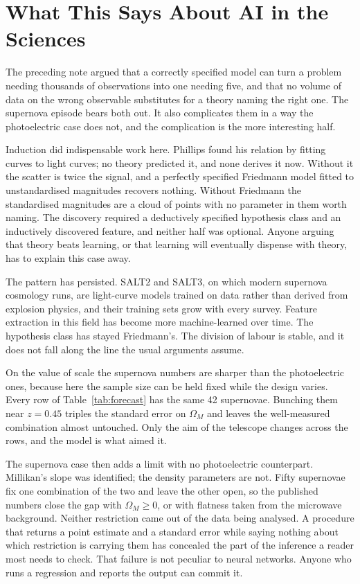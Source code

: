 \documentclass[11pt]{article}
\begin{document}
\section{What This Says About AI in the Sciences}

The preceding note argued that a correctly specified model can turn a problem
needing thousands of observations into one needing five, and that no volume of
data on the wrong observable substitutes for a theory naming the right one.
The supernova episode bears both out.  It also complicates them in a way the
photoelectric case does not, and the complication is the more interesting
half.

Induction did indispensable work here.  Phillips found his relation by fitting
curves to light curves; no theory predicted it, and none derives it now.
Without it the scatter is twice the signal, and a perfectly specified
Friedmann model fitted to unstandardised magnitudes recovers nothing.  Without
Friedmann the standardised magnitudes are a cloud of points with no parameter
in them worth naming.  The discovery required a deductively specified
hypothesis class and an inductively discovered feature, and neither half was
optional.  Anyone arguing that theory beats learning, or that learning will
eventually dispense with theory, has to explain this case away.

The pattern has persisted.  SALT2 and SALT3, on which modern supernova
cosmology runs, are light-curve models trained on data rather than derived
from explosion physics, and their training sets grow with every survey.
Feature extraction in this field has become more machine-learned over time.
The hypothesis class has stayed Friedmann's.  The division of labour is
stable, and it does not fall along the line the usual arguments assume.

On the value of scale the supernova numbers are sharper than the photoelectric
ones, because here the sample size can be held fixed while the design varies.
Every row of Table~\ref{tab:forecast} has the same 42 supernovae.  Bunching
them near $z = 0.45$ triples the standard error on $\Omega_M$ and leaves the
well-measured combination almost untouched.  Only the aim of the telescope
changes across the rows, and the model is what aimed it.

The supernova case then adds a limit with no photoelectric counterpart.
Millikan's slope was identified; the density parameters are not.  Fifty
supernovae fix one combination of the two and leave the other open, so the
published numbers close the gap with $\Omega_M \geq 0$, or with flatness taken
from the microwave background.  Neither restriction came out of the data being
analysed.  A procedure that returns a point estimate and a standard error
while saying nothing about which restriction is carrying them has concealed
the part of the inference a reader most needs to check.  That failure is not
peculiar to neural networks.  Anyone who runs a regression and reports the
output can commit it.
\end{document}
